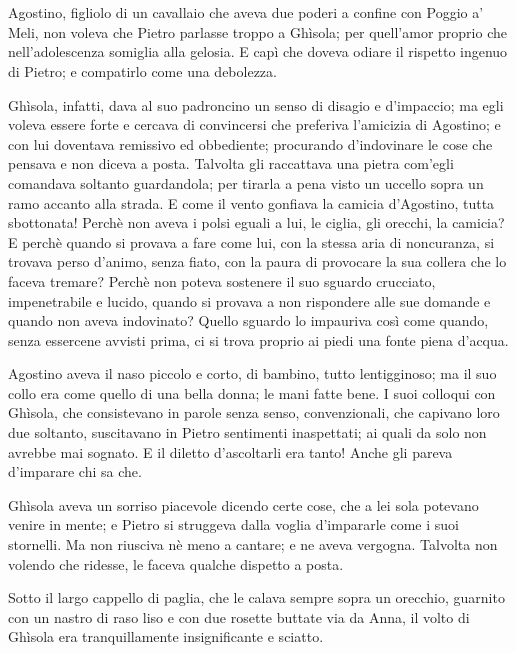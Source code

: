 \chapter{}

Agostino, figliolo di un cavallaio che aveva due poderi a confine con Poggio a’ Meli, non voleva che Pietro parlasse troppo a Ghìsola; per quell’amor proprio che nell’adolescenza somiglia alla gelosia. E capì che doveva odiare il rispetto ingenuo di Pietro; e compatirlo come una debolezza.

Ghìsola, infatti, dava al suo padroncino un senso di disagio e d’impaccio; ma egli voleva essere forte e cercava di convincersi che preferiva l’amicizia di Agostino; e con lui doventava remissivo ed obbediente; procurando d’indovinare le cose che pensava e non diceva a posta. Talvolta gli raccattava una pietra com’egli comandava soltanto guardandola; per tirarla a pena visto un uccello sopra un ramo accanto alla strada. E come il vento gonfiava la camicia d’Agostino, tutta sbottonata! Perchè non aveva i polsi eguali a lui, le ciglia, gli orecchi, la camicia? E perchè quando si provava a fare come lui, con la stessa aria di noncuranza, si trovava perso d’animo, senza fiato, con la paura di provocare la sua collera che lo faceva tremare? Perchè non poteva sostenere il suo sguardo crucciato, impenetrabile e lucido, quando si provava a non rispondere alle sue domande e quando non aveva indovinato? Quello sguardo lo impauriva così come quando, senza essercene avvisti prima, ci si trova proprio ai piedi una fonte piena d’acqua.

Agostino aveva il naso piccolo e corto, di bambino, tutto lentigginoso; ma il suo collo era come quello di una bella donna; le mani fatte bene. I suoi colloqui con Ghìsola, che consistevano in parole senza senso, convenzionali, che capivano loro due soltanto, suscitavano in Pietro sentimenti inaspettati; ai quali da solo non avrebbe mai sognato. E il diletto d’ascoltarli era tanto! Anche gli pareva d’imparare chi sa che.

Ghìsola aveva un sorriso piacevole dicendo certe cose, che a lei sola potevano venire in mente; e Pietro si struggeva dalla voglia d’impararle come i suoi stornelli. Ma non riusciva nè meno a cantare; e ne aveva vergogna. Talvolta non volendo che ridesse, le faceva qualche dispetto a posta.

Sotto il largo cappello di paglia, che le calava sempre sopra un orecchio, guarnito con un nastro di raso liso e con due rosette buttate via da Anna, il volto di Ghìsola era tranquillamente insignificante e sciatto.


